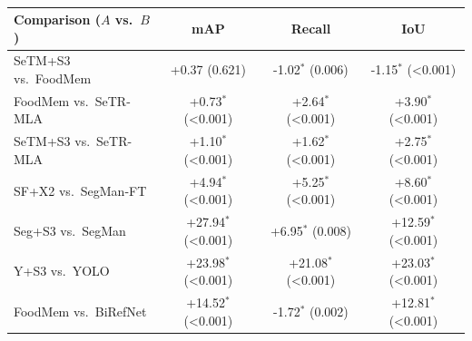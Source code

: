 \begin{table}[htb]
\centering
\footnotesize
\caption{}
\label{tab:significance}
\begin{tabular}{lccc}
\toprule
\textbf{Comparison ($A$ vs.\ $B$)} & \textbf{mAP} & \textbf{Recall} & \textbf{IoU} \\
\midrule
SeTM+S3 vs.\ FoodMem & +0.37 (0.621) & -1.02$^{*}$ (0.006) & -1.15$^{*}$ (<0.001) \\
FoodMem vs.\ SeTR-MLA & +0.73$^{*}$ (<0.001) & +2.64$^{*}$ (<0.001) & +3.90$^{*}$ (<0.001) \\
SeTM+S3 vs.\ SeTR-MLA & +1.10$^{*}$ (<0.001) & +1.62$^{*}$ (<0.001) & +2.75$^{*}$ (<0.001) \\
SF+X2 vs.\ SegMan-FT & +4.94$^{*}$ (<0.001) & +5.25$^{*}$ (<0.001) & +8.60$^{*}$ (<0.001) \\
Seg+S3 vs.\ SegMan & +27.94$^{*}$ (<0.001) & +6.95$^{*}$ (0.008) & +12.59$^{*}$ (<0.001) \\
Y+S3 vs.\ YOLO & +23.98$^{*}$ (<0.001) & +21.08$^{*}$ (<0.001) & +23.03$^{*}$ (<0.001) \\
FoodMem vs.\ BiRefNet & +14.52$^{*}$ (<0.001) & -1.72$^{*}$ (0.002) & +12.81$^{*}$ (<0.001) \\
\bottomrule
\end{tabular}
\end{table}
